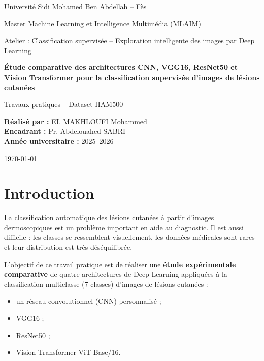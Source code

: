 \documentclass[12pt,a4paper]{article}
\begin{document}
\begin{titlepage}
\centering
{\large Université Sidi Mohamed Ben Abdellah -- Fès\par}
{\large Master Machine Learning et Intelligence Multimédia (MLAIM)\par}
\vspace{1cm}
{\large Atelier : Classification supervisée -- Exploration intelligente des images par Deep Learning\par}
\vspace{2.5cm}
{\Huge\bfseries Étude comparative des architectures CNN, VGG16, ResNet50 et Vision Transformer pour la classification supervisée d'images de lésions cutanées\par}
\vspace{1.5cm}
{\Large Travaux pratiques -- Dataset HAM500\par}
\vfill
\begin{flushleft}
\large
\textbf{Réalisé par :} EL MAKHLOUFI Mohammed\\[4pt]
\textbf{Encadrant :} Pr. Abdelouahed SABRI\\[4pt]
\textbf{Année universitaire :} 2025--2026
\end{flushleft}
\vspace{1cm}
{\large \today\par}
\end{titlepage}

\tableofcontents
\newpage

\section{Introduction}
La classification automatique des lésions cutanées à partir d'images dermoscopiques est un problème important en aide au diagnostic. Il est aussi difficile : les classes se ressemblent visuellement, les données médicales sont rares et leur distribution est très déséquilibrée.

L'objectif de ce travail pratique est de réaliser une \textbf{étude expérimentale comparative} de quatre architectures de Deep Learning appliquées à la classification multiclasse (7 classes) d'images de lésions cutanées :
\begin{itemize}[nosep]
  \item un réseau convolutionnel (CNN) personnalisé ;
  \item VGG16 ;
  \item ResNet50 ;
  \item Vision Transformer ViT-Base/16.
\end{itemize}
\end{document}
